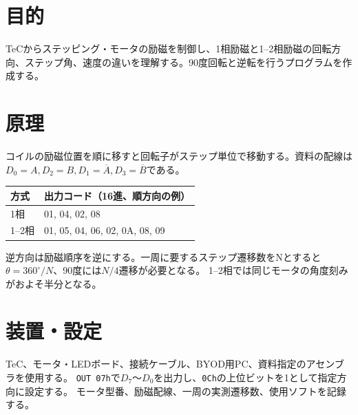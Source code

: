 \documentclass[lualatex,a4paper,10pt]{jlreq}
\begin{document}
\reporttitle
{}

\section{目的}\label{sec:auto1}
TeCからステッピング・モータの励磁を制御し、1相励磁と1--2相励磁の回転方向、ステップ角、速度の違いを理解する。90度回転と逆転を行うプログラムを作成する。
\section{原理}\label{sec:auto2}
コイルの励磁位置を順に移すと回転子がステップ単位で移動する。資料の配線は
$D_0=A,D_2=B,D_1=\overline A,D_3=\overline B$である。
\par\noindent\begin{tabularx}{\linewidth}{lY}
\toprule 方式 & 出力コード（16進、順方向の例）\\\midrule
1相 & 01, 04, 02, 08\\
1--2相 & 01, 05, 04, 06, 02, 0A, 08, 09\\\bottomrule
\end{tabularx}
逆方向は励磁順序を逆にする。一周に要するステップ遷移数をNとすると$\theta=360^\circ/N$、90度には$N/4$遷移が必要となる。
1--2相では同じモータの角度刻みがおよそ半分となる。
\section{装置・設定}\label{sec:auto3}
TeC、モータ・LEDボード、接続ケーブル、BYOD用PC、資料指定のアセンブラを使用する。
\texttt{OUT 07h}で$D_7$〜$D_0$を出力し、\texttt{0Ch}の上位ビットを1として指定方向に設定する。
モータ型番、励磁配線、一周の実測遷移数、使用ソフトを記録する。
\writing{18mm}
\end{document}
